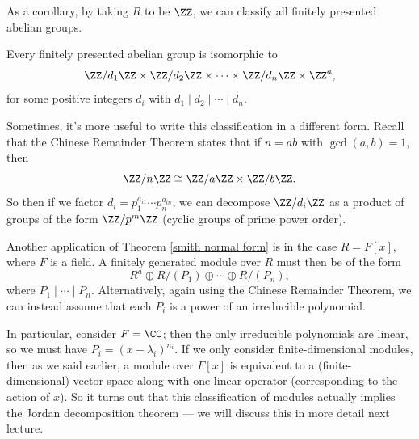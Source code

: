 As a corollary, by taking $R$ to be $\ZZ$, we can classify all finitely presented abelian groups.

\begin{corollary}\label{abelian groups}
Every finitely presented abelian group is isomorphic to \[\ZZ/d_1\ZZ \times \ZZ/d_2\ZZ \times \cdots \times \ZZ/d_n\ZZ \times \ZZ^a,\] for some positive integers $d_i$ with $d_1 \mid d_2 \mid \cdots \mid d_n$.
\end{corollary}

Sometimes, it's more useful to write this classification in a different form. Recall that the Chinese Remainder Theorem states that if $n = ab$ with $\gcd(a, b) = 1$, then \[\ZZ/n\ZZ \cong \ZZ/a\ZZ \times \ZZ/b\ZZ.\] So then if we factor $d_i = p_1^{a_{i1}}\cdots p_n^{a_{in}}$, we can decompose $\ZZ/d_i\ZZ$ as a product of groups of the form $\ZZ/p^m\ZZ$ (cyclic groups of prime power order).


Another application of Theorem \ref{smith normal form} is in the case $R = F[x]$, where $F$ is a field. A finitely generated module over $R$ must then be of the form \[R^a \oplus R/(P_1) \oplus \cdots \oplus R/(P_n),\] where $P_1 \mid \cdots \mid P_n$. Alternatively, again using the Chinese Remainder Theorem, we can instead assume that each $P_i$ is a power of an irreducible polynomial. 

In particular, consider $F = \CC$; then the only irreducible polynomials are linear, so we must have $P_i = (x - \lambda_i)^{n_i}$. If we only consider finite-dimensional modules, then as we said earlier, a module over $F[x]$ is equivalent to a (finite-dimensional) vector space along with one linear operator (corresponding to the action of $x$). So it turns out that this classification of modules actually implies the Jordan decomposition theorem --- we will discuss this in more detail next lecture. 



